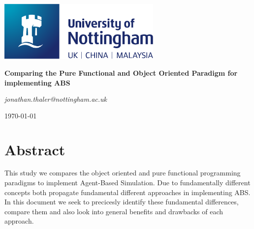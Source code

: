 \documentclass[oneside]{book}
\begin{document}
\begin{titlepage}
	\centering
	\includegraphics[width=0.60\textwidth]{../../logo/UoN_Primary_Logo_RGB.png}\par\vspace{1cm}
	\vspace{1.5cm}
	{\huge\bfseries Comparing the Pure Functional and Object Oriented Paradigm for implementing ABS \par}
	\vspace{2cm}
	{\Large\itshape jonathan.thaler@nottingham.ac.uk \par}
	\vfill
	
	\vfill

	{\large \today\par}
\end{titlepage}

\cleardoublepage

\section*{Abstract}
This study we compares the object oriented and pure functional programming paradigms to implement Agent-Based Simulation. Due to fundamentally different concepts both propagate fundamental different approaches in implementing ABS. In this document we seek to precicesly identify these fundamental differences, compare them and also look into general benefits and drawbacks of each approach.

\clearpage
\tableofcontents
\clearpage





\renewcommand\bibname{References}



\end{document}
